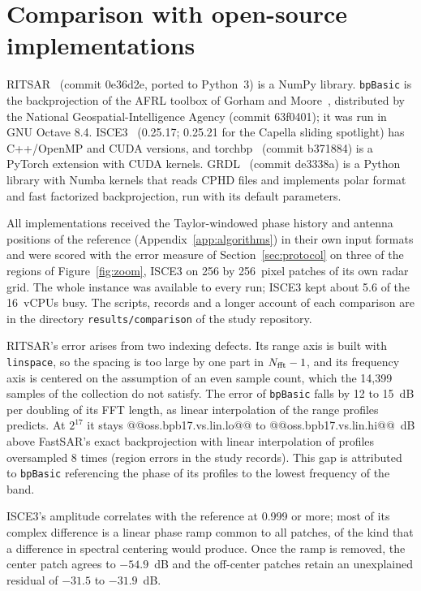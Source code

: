 \documentclass[11pt]{article}
\begin{document}
\section{Comparison with open-source implementations}
\label{app:oss}

RITSAR~\cite{ritsar} (commit 0e36d2e, ported to Python~3) is a NumPy library. \texttt{bpBasic} is the backprojection of the AFRL toolbox of Gorham and Moore~\cite{gorham2010}, distributed by the National Geospatial-Intelligence Agency (commit 63f0401); it was run in GNU Octave 8.4. ISCE3~\cite{isce3} (0.25.17; 0.25.21 for the Capella sliding spotlight) has C++/OpenMP and CUDA versions, and torchbp~\cite{torchbp} (commit b371884) is a PyTorch extension with CUDA kernels. GRDL~\cite{grdl} (commit de3338a) is a Python library with Numba kernels that reads CPHD files and implements polar format and fast factorized backprojection, run with its default parameters.

All implementations received the Taylor-windowed phase history and antenna positions of the reference (Appendix~\ref{app:algorithms}) in their own input formats and were scored with the error measure of Section~\ref{sec:protocol} on three of the regions of Figure~\ref{fig:zoom}, ISCE3 on 256 by 256~pixel patches of its own radar grid. The whole instance was available to every run; ISCE3 kept about 5.6 of the 16~vCPUs busy. The scripts, records and a longer account of each comparison are in the directory \texttt{results/comparison} of the study repository.

RITSAR's error arises from two indexing defects. Its range axis is built with \texttt{linspace}, so the spacing is too large by one part in $N_{\rm fft}-1$, and its frequency axis is centered on the assumption of an even sample count, which the 14,399 samples of the collection do not satisfy. The error of \texttt{bpBasic} falls by 12 to 15~dB per doubling of its FFT length, as linear interpolation of the range profiles predicts. At $2^{17}$ it stays @@oss.bpb17.vs.lin.lo@@ to @@oss.bpb17.vs.lin.hi@@~dB above FastSAR's exact backprojection with linear interpolation of profiles oversampled 8 times (region errors in the study records). This gap is attributed to \texttt{bpBasic} referencing the phase of its profiles to the lowest frequency of the band.

ISCE3's amplitude correlates with the reference at 0.999 or more; most of its complex difference is a linear phase ramp common to all patches, of the kind that a difference in spectral centering would produce. Once the ramp is removed, the center patch agrees to $-54.9$~dB and the off-center patches retain an unexplained residual of $-31.5$ to $-31.9$~dB.
\end{document}
